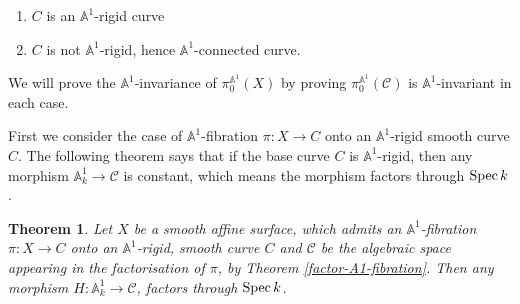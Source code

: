 \documentclass[11pt, reqno]{amsart}
\theoremstyle{plain}
\newtheorem{theorem}[thm]{Theorem}
\theoremstyle{definition}
\newcommand{\Spec}{{\rm Spec \,}}
\newcommand{\sC}{{\mathcal C}}
\newcommand{\A}{{\mathbb A}}
\renewcommand{\P}{{\mathbb P}}
\begin{document}
\begin{enumerate}
	\item $C$ is an $\A^1$-rigid curve
	\item $C$ is not $\A^1$-rigid, hence $\A^1$-connected curve.
\end{enumerate} 
 We will prove the $\A^1$-invariance of $\pi_0^{\A^1}(X)$ by proving $\pi_0^{\A^1}(\sC)$ is $\A^1$-invariant in each case.

First we consider the case of $\A^1$-fibration $\pi: X\to C$ onto an $\A^1$-rigid smooth curve $C$. The following theorem says that if the base curve $C$ is $\mathbb{A}^1$-rigid, then any morphism $\mathbb{A}^1_k \to \sC$ is constant, which means the morphism factors through $\Spec k$. 

		\begin{theorem}\label{rigid-base}
			Let $X$ be a smooth affine surface, which admits an $\mathbb{A}^1$-fibration $\pi: X \to C$ onto an  
$\A^1$-rigid, smooth curve $C$ and
$\sC$ be the algebraic space 
appearing in the factorisation of $\pi$, by Theorem \ref{factor-A1-fibration}. Then any morphism $H: \A^1_k \to \sC$, factors through $\Spec k$.
		\end{theorem}
		
\end{document}
